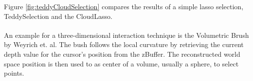 Figure \ref{fig:teddyCloudSelection} compares the results of a simple lasso selection, TeddySelection and the CloudLasso. 
\\
\\

An example for a three-dimensional interaction technique is the Volumetric Brush by Weyrich et. al\cite{weyrich2004post}. The bush follows the local curvature by retrieving the current depth value for the cursor's position from the zBuffer. The reconstructed world space position is then used to as center of a volume, usually a sphere, to select points. 
